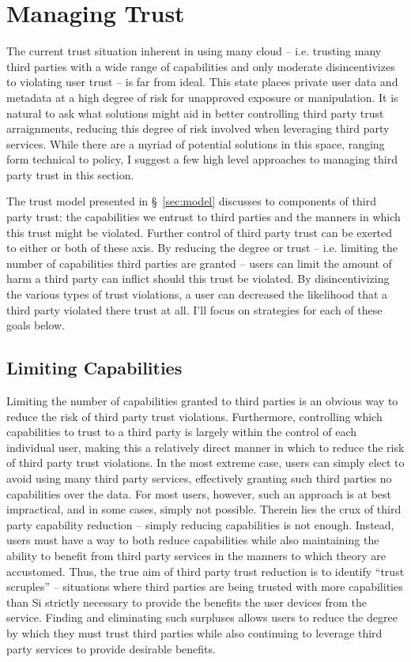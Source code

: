 \section{Managing Trust}
\label{sec:mitigation}

The current trust situation inherent in using many cloud --
i.e. trusting many third parties with a wide range of capabilities and
only moderate disincentivizes to violating user trust -- is far from
ideal. This state places private user data and metadata at a high
degree of risk for unapproved exposure or manipulation. It is natural
to ask what solutions might aid in better controlling third party
trust arraignments, reducing this degree of risk involved when
leveraging third party services. While there are a myriad of potential
solutions in this space, ranging form technical to policy, I suggest a
few high level approaches to managing third party trust in this
section.

The trust model presented in \S~\ref{sec:model} discusses to
components of third party trust: the capabilities we entrust to third
parties and the manners in which this trust might be violated. Further
control of third party trust can be exerted to either or both of these
axis. By reducing the degree or trust -- i.e. limiting the number of
capabilities third parties are granted -- users can limit the amount
of harm a third party can inflict should this trust be violated. By
disincentivizing the various types of trust violations, a user can
decreased the likelihood that a third party violated there trust at
all. I'll focus on strategies for each of these goals below.

\subsection{Limiting Capabilities}
\label{sec:mitigation:capabilites}

Limiting the number of capabilities granted to third parties is an
obvious way to reduce the risk of third party trust
violations. Furthermore, controlling which capabilities to trust to a
third party is largely within the control of each individual user,
making this a relatively direct manner in which to reduce the risk of
third party trust violations. In the most extreme case, users can
simply elect to avoid using many third party services, effectively
granting such third parties no capabilities over the data. For most
users, however, such an approach is at best impractical, and in some
cases, simply not possible. Therein lies the crux of third party
capability reduction -- simply reducing capabilities is not
enough. Instead, users must have a way to both reduce capabilities
while also maintaining the ability to benefit from third party
services in the manners to which theory are accustomed. Thus, the true
aim of third party trust reduction is to identify ``trust scruples''
-- situations where third parties are being trusted with more
capabilities than Si strictly necessary to provide the benefits the
user devices from the service. Finding and eliminating such surpluses
allows users to reduce the degree by which they must trust third
parties while also continuing to leverage third party services to
provide desirable benefits.

